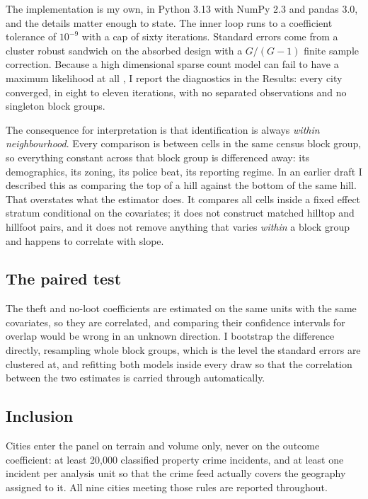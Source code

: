 \documentclass[10pt,letterpaper]{article}
\begin{document}
The implementation is my own, in Python 3.13 with NumPy 2.3 and pandas 3.0, and the
details matter enough to state. The inner loop runs to a coefficient tolerance of
$10^{-9}$ with a cap of sixty iterations. Standard errors come from a cluster robust
sandwich on the absorbed design with a $G/(G-1)$ finite sample correction. Because a
high dimensional sparse count model can fail to have a maximum likelihood at all
\cite{correia2020}, I report the diagnostics in the Results: every city converged,
in eight to eleven iterations, with no separated observations and no singleton block
groups.

The consequence for interpretation is that identification is always \emph{within
neighbourhood}. Every comparison is between cells in the same census block group, so
everything constant across that block group is differenced away: its demographics,
its zoning, its police beat, its reporting regime. In an earlier draft I described
this as comparing the top of a hill against the bottom of the same hill. That
overstates what the estimator does. It compares all cells inside a fixed effect
stratum conditional on the covariates; it does not construct matched hilltop and
hillfoot pairs, and it does not remove anything that varies \emph{within} a block
group and happens to correlate with slope.

\subsection*{The paired test}

The theft and no-loot coefficients are estimated on the same units with the same
covariates, so they are correlated, and comparing their confidence intervals for
overlap would be wrong in an unknown direction. I bootstrap the difference directly,
resampling whole block groups, which is the level the standard errors are clustered
at, and refitting both models inside every draw so that the correlation between the
two estimates is carried through automatically.

\subsection*{Inclusion}

Cities enter the panel on terrain and volume only, never on the outcome coefficient:
at least 20,000 classified property crime incidents, and at least one incident per
analysis unit so that the crime feed actually covers the geography assigned to it.
All nine cities meeting those rules are reported throughout.
\end{document}
